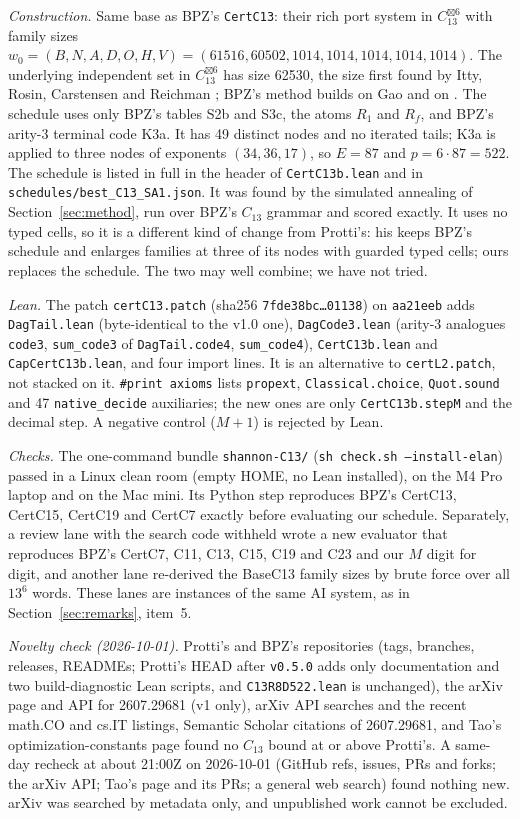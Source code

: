 \documentclass[11pt]{amsart}
\newcommand{\sbx}{\boxtimes}
\newcommand{\code}[1]{\texttt{#1}}
\begin{document}
\emph{Construction.} Same base as BPZ's \code{CertC13}: their rich port system in
$C_{13}^{\sbx 6}$ with family sizes $w_0=(B,N,A,D,O,H,V)=(61516,60502,1014,1014,1014,1014,1014)$.
The underlying independent set in $C_{13}^{\sbx 6}$ has size 62530, the size first found by Itty,
Rosin, Carstensen and Reichman \cite{IRCR}; BPZ's method builds on Gao \cite{Gao} and on
\cite{IRCR}. The schedule uses only BPZ's tables S2b and S3c, the atoms $R_1$ and $R_f$, and BPZ's
arity-3 terminal code K3a. It has 49 distinct nodes and no iterated tails; K3a is applied to three
nodes of exponents $(34,36,17)$, so $E=87$ and $p=6\cdot87=522$. The schedule is listed in full in
the header of \code{CertC13b.lean} and in \code{schedules/best\_C13\_SA1.json}. It was found by the
simulated annealing of Section~\ref{sec:method}, run over BPZ's $C_{13}$ grammar and scored
exactly. It uses no typed cells, so it is a different kind of change from Protti's: his keeps
BPZ's schedule and enlarges families at three of its nodes with guarded typed cells; ours replaces
the schedule. The two may well combine; we have not tried.

\emph{Lean.} The patch \code{certC13.patch} (sha256 \code{7fde38bc\ldots01138}) on \code{aa21eeb}
adds \code{DagTail.lean} (byte-identical to the v1.0 one), \code{DagCode3.lean} (arity-3 analogues
\code{code3}, \code{sum\_code3} of \code{DagTail.code4}, \code{sum\_code4}), \code{CertC13b.lean}
and \code{CapCertC13b.lean}, and four import lines. It is an alternative to \code{certL2.patch},
not stacked on it. \code{\#print axioms} lists \code{propext}, \code{Classical.choice},
\code{Quot.sound} and 47 \code{native\_decide} auxiliaries; the new ones are only
\code{CertC13b.stepM} and the decimal step. A negative control ($M+1$) is rejected by Lean.

\emph{Checks.} The one-command bundle \code{shannon-C13/} (\code{sh check.sh --install-elan})
passed in a Linux clean room (empty HOME, no Lean installed), on the M4 Pro laptop and on the Mac
mini. Its Python step reproduces BPZ's CertC13, CertC15, CertC19 and CertC7 exactly before
evaluating our schedule. Separately, a review lane with the search code withheld wrote a new
evaluator that reproduces BPZ's CertC7, C11, C13, C15, C19 and C23 and our $M$ digit for digit,
and another lane re-derived the BaseC13 family sizes by brute force over all $13^6$ words. These
lanes are instances of the same AI system, as in Section~\ref{sec:remarks}, item~5.

\emph{Novelty check (2026-10-01).} Protti's and BPZ's repositories (tags, branches, releases,
READMEs; Protti's HEAD after \code{v0.5.0} adds only documentation and two build-diagnostic Lean
scripts, and \code{C13R8D522.lean} is unchanged), the arXiv page and API for 2607.29681 (v1
only), arXiv API searches and the recent math.CO and cs.IT listings, Semantic Scholar citations of
2607.29681, and Tao's optimization-constants page found no $C_{13}$ bound at or above Protti's. A
same-day recheck at about 21:00Z on 2026-10-01 (GitHub refs, issues, PRs and forks; the arXiv
API; Tao's page and its PRs; a general web search) found nothing new. arXiv was searched by
metadata only, and unpublished work cannot be excluded.
\end{document}
